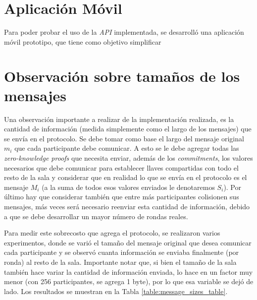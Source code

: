 \section{Aplicación Móvil}

Para poder probar el uso de la \emph{API} implementada, se desarrolló una 
aplicación móvil prototipo, que tiene como objetivo simplificar 

\section{Observación sobre tamaños de los mensajes}

Una observación importante a realizar de la implementación realizada, es la 
cantidad de información (medida simplemente como el largo de los mensajes) que 
se envía en el protocolo. Se debe tomar como base el largo del mensaje 
original $m_i$ que cada participante debe comunicar. A esto se le debe agregar 
todas las \emph{zero-knowledge proofs} que necesita enviar, además de los \emph
{commitments}, los valores necesarios que debe comunicar para establecer 
llaves compartidas con todo el resto de la sala y considerar que en realidad 
lo que se envía en el protocolo es el mensaje $M_i$ (a la suma de todos esos 
valores enviados le denotaremos $S_i$). Por último hay que considerar también 
que entre más participantes colisionen sus mensajes, más veces será necesario 
reenviar esta cantidad de información, debido a que se debe desarrollar un 
mayor número de rondas reales.

Para medir este sobrecosto que agrega el protocolo, se realizaron varios 
experimentos, donde se varió el tamaño del mensaje original que desea 
comunicar cada participante y se observó cuanta información se enviaba 
finalmente (por ronda) al resto de la sala. Importante notar que, si bien el 
tamaño de la sala también hace variar la cantidad de información enviada, lo 
hace en un factor muy menor (con 256 participantes, se agrega 1 byte), por lo 
que esa variable se dejó de lado. Los resultados se muestran en la Tabla \ref{table:message_sizes_table}.

